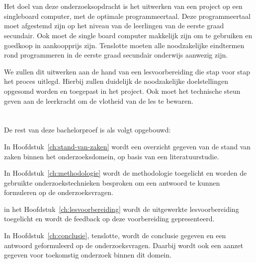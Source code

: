 \section{}
\label{sec:onderzoeksdoelstelling}

Het doel van deze onderzoeksopdracht is het uitwerken van een project op een singleboard computer, met de optimale programmeertaal. Deze programmeertaal moet afgestemd zijn op het niveau van de leerlingen van de eerste graad secundair. Ook moet de single board computer makkelijk zijn om te gebruiken en goedkoop in aankoopprijs zijn. Tenslotte moeten alle noodzakelijke eindtermen rond programmeren in de eerste graad secundair onderwijs aanwezig zijn.

We zullen dit uitwerken aan de hand van een lesvoorbereiding die stap voor stap het proces uitlegd. Hierbij zullen duidelijk de noodzakelijke doelstellingen opgesomd worden en toegepast in het project. Ook moet het technische steun geven aan de leerkracht om de vlotheid van de les te bewaren.

\section{}
\label{sec:opzet-bachelorproef}


De rest van deze bachelorproef is als volgt opgebouwd:

In Hoofdstuk~\ref{ch:stand-van-zaken} wordt een overzicht gegeven van de stand van zaken binnen het onderzoeksdomein, op basis van een literatuurstudie.

In Hoofdstuk~\ref{ch:methodologie} wordt de methodologie toegelicht en worden de gebruikte onderzoekstechnieken besproken om een antwoord te kunnen formuleren op de onderzoeksvragen.


in het Hoofdstuk~\ref{ch:lesvoorbereiding} wordt de uitgewerkte lesvoorbereiding toegelicht en wordt de feedback op deze voorbereiding gepresenteerd.

In Hoofdstuk~\ref{ch:conclusie}, tenslotte, wordt de conclusie gegeven en een antwoord geformuleerd op de onderzoeksvragen. Daarbij wordt ook een aanzet gegeven voor toekomstig onderzoek binnen dit domein.